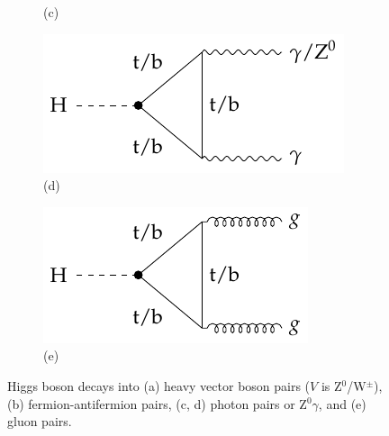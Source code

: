 \begin{figure}[!ht]
\begin{subfigure}[t]{0.33\mylength}
            \caption{\footnotesize (c)}
    \end{subfigure}%
    \begin{subfigure}[t]{0.33\mylength}
            \centering
            \includegraphics[height=0.1526\mylength]{resources/H_decay_diagrams/v4.pdf}
            \setlength{\unitlength}{0.25\mylength}
            \caption{\footnotesize (d)}
    \end{subfigure}%
    \begin{subfigure}[t]{0.33\mylength}
            \centering
            \includegraphics[height=0.1526\mylength]{resources/H_decay_diagrams/v5.pdf}
            \setlength{\unitlength}{0.25\mylength}
            \vspace*{0.5cm}
            \caption{\footnotesize (e)}
    \end{subfigure}%
    \vspace*{-0.0cm}
    \caption{Higgs boson decays into (a) heavy vector boson pairs ($V$ is Z$^{0}$/W$^{\pm}$), (b) fermion-antifermion pairs, (c, d) photon pairs or Z$^0\gamma$, and (e) gluon pairs.}
    \label{fig:Higgs_decays}
    \vspace*{-0.0cm}
\end{figure}

